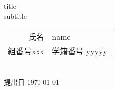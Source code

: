\documentclass[a4j,dvipdfmx]{jsarticle}
\begin{document}
\def\tomorrow{\advance\day by 1
			 \today
			 \advance\day by -1}

\begin{titlepage}
\begin{center}
\vspace*{30pt}
{\huge title}\\
\vspace{10pt}
{\Large subtitle}\\
\vspace{12cm}
\begin{tabular}{rl}
氏名 & name\\
組番号xxx & 学籍番号 yyyyy\\
\end{tabular} \vspace{3pt} \\
提出日 \today \vspace{12pt} \\
\end{center}
\end{titlepage}


\end{document}
